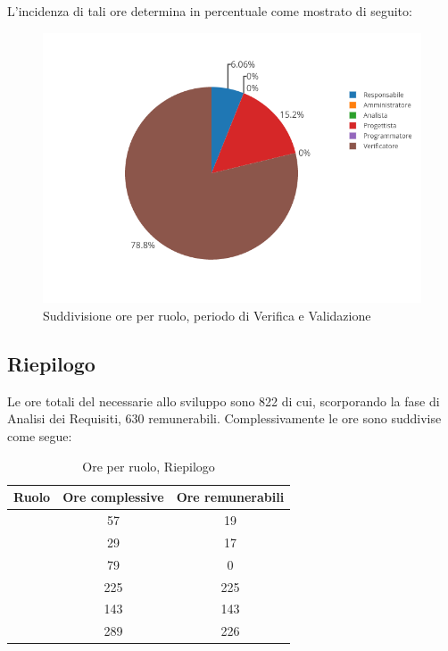 L'incidenza di tali ore determina in percentuale come mostrato di seguito:
\begin{figure}[H]
	\centering
	\includegraphics[scale=0.6]{img/Validazione.png}
	\caption{Suddivisione ore per ruolo, periodo di Verifica e Validazione}
\end{figure}

\subsection{Riepilogo}
Le ore totali del necessarie allo sviluppo sono 822 di cui, scorporando la fase di Analisi dei Requisiti, 630 remunerabili. Complessivamente le ore sono suddivise come segue:

\begin{table}[H]
	\begin{center}
		\begin{tabular}{|c|c|c|}
			\hline
			\textbf{Ruolo}	& \textbf{Ore complessive} & \textbf{Ore remunerabili} \\
			\hline
			\Res	&	57	&	19	\\
			\hline
			\Amm	&	29	&	17	\\
			\hline
			\Ana	&	79	&	0	\\
			\hline
			\Prog	&	225	&	225	\\
			\hline
			\Progr	&	143	&	143	\\
			\hline
			\Ver	&	289	&	226	\\
			\hline
		\end{tabular}
	\end{center}
	\caption{Ore per ruolo, Riepilogo}
\end{table}

